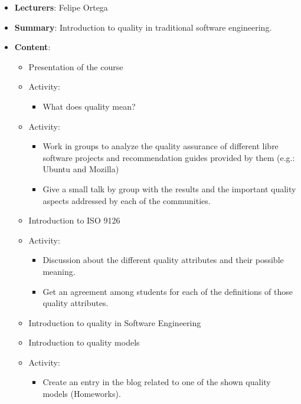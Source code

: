 \documentclass[a4paper]{article}
\begin{document}
\begin{itemize}
 \item \textbf{Lecturers}: Felipe Ortega
 \item \textbf{Summary}: Introduction to quality in traditional software engineering.
 \item \textbf{Content}:

    \begin{itemize}
      \item Presentation of the course
      \item Activity:
        \begin{itemize}
          \item What does quality mean?
        \end{itemize}
      \item Activity:
        \begin{itemize}
          \item Work in groups to analyze the quality assurance of different 
          libre software projects and recommendation guides provided by them 
          (e.g.: Ubuntu and Mozilla)
          \item Give a small talk by group with the results and the important 
          quality aspects addressed by each of the communities.
        \end{itemize}
      \item Introduction to ISO 9126
      \item Activity:
        \begin{itemize}
          \item Discussion about the different quality attributes and their possible
          meaning.
          \item Get an agreement among students for each of the definitions of 
          those quality attributes.
        \end{itemize}
       \item Introduction to quality in Software Engineering
       \item Introduction to quality models
       \item Activity:
         \begin{itemize} 
           \item Create an entry in the blog related to one of the shown quality
           models (Homeworks).
         \end{itemize}
    \end{itemize}

   
\end{itemize}
\end{document}
